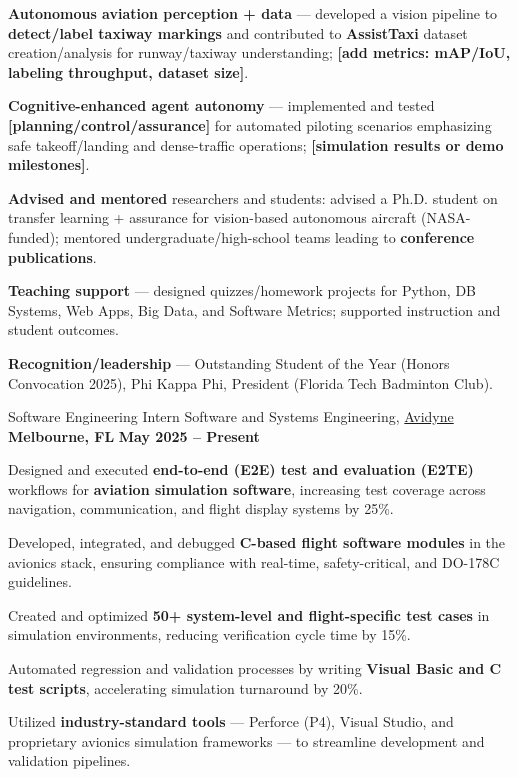 \begin{cventries}
{\begin{cvitems}
\item \textbf{Autonomous aviation perception + data} — developed a vision pipeline to \textbf{detect/label taxiway markings} and contributed to \textbf{AssistTaxi} dataset creation/analysis for runway/taxiway understanding; \textbf{[add metrics: mAP/IoU, labeling throughput, dataset size]}.
\item \textbf{Cognitive-enhanced agent autonomy} — implemented and tested \textbf{[planning/control/assurance]} for automated piloting scenarios emphasizing safe takeoff/landing and dense-traffic operations; \textbf{[simulation results or demo milestones]}.
\item \textbf{Advised and mentored} researchers and students: advised a Ph.D. student on transfer learning + assurance for vision-based autonomous aircraft (NASA-funded); mentored undergraduate/high-school teams leading to \textbf{conference publications}.
\item \textbf{Teaching support} — designed quizzes/homework projects for Python, DB Systems, Web Apps, Big Data, and Software Metrics; supported instruction and student outcomes.
\item \textbf{Recognition/leadership} — Outstanding Student of the Year (Honors Convocation 2025), Phi Kappa Phi, President (Florida Tech Badminton Club).
\end{cvitems}
}
\cventry
{Software Engineering Intern}
{Software and Systems Engineering, \href{https://www.avidyne.com/}{Avidyne}}
{\textbf{Melbourne, FL}}
{\textbf{May 2025 – Present}}
{
\begin{cvitems}
  \item Designed and executed \textbf{end-to-end (E2E) test and evaluation (E2TE)} workflows for \textbf{aviation simulation software}, increasing test coverage across navigation, communication, and flight display systems by 25\%.
  \item Developed, integrated, and debugged \textbf{C-based flight software modules} in the avionics stack, ensuring compliance with real-time, safety-critical, and DO-178C guidelines.
  \item Created and optimized \textbf{50+ system-level and flight-specific test cases} in simulation environments, reducing verification cycle time by 15\%.
  \item Automated regression and validation processes by writing \textbf{Visual Basic and C test scripts}, accelerating simulation turnaround by 20\%.
  \item Utilized \textbf{industry-standard tools} — Perforce (P4), Visual Studio, and proprietary avionics simulation frameworks — to streamline development and validation pipelines.

\end{cvitems}}
\end{cventries}
